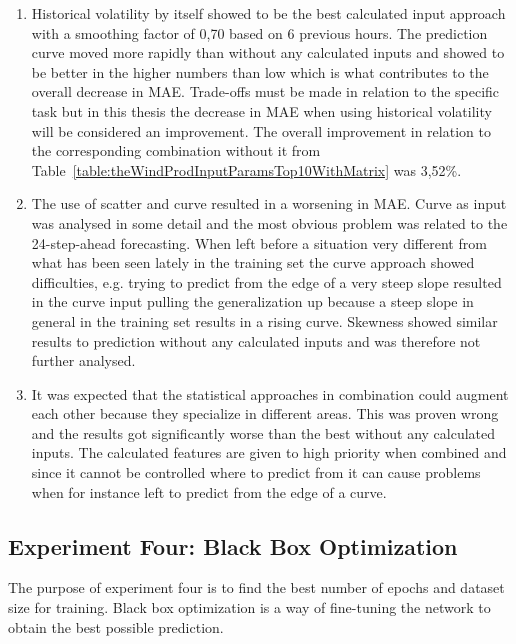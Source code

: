 \begin{enumerate}
\item Historical volatility by itself showed to be the best calculated input approach with a smoothing factor of 0,70 based on 6 previous hours. The prediction curve moved more rapidly than without any calculated inputs and showed to be better in the higher numbers than low which is what contributes to the overall decrease in MAE. Trade-offs must be made in relation to the specific task but in this thesis the decrease in MAE when using historical volatility will be considered an improvement. The overall improvement in relation to the corresponding combination without it from Table~\ref{table:theWindProdInputParamsTop10WithMatrix} was 3,52\%.
\item The use of scatter and curve resulted in a worsening in MAE. Curve as input was analysed in some detail and the most obvious problem was related to the 24-step-ahead forecasting. When left before a situation very different from what has been seen lately in the training set the curve approach showed difficulties, e.g. trying to predict from the edge of a very steep slope resulted in the curve input pulling the generalization up because a steep slope in general in the training set results in a rising curve. Skewness showed similar results to prediction without any calculated inputs and was therefore not further analysed.
\item It was expected that the statistical approaches in combination could augment each other because they specialize in different areas. This was proven wrong and the results got significantly worse than the best without any calculated inputs. The calculated features are given to high priority when combined and since it cannot be controlled where to predict from it can cause problems when for instance left to predict from the edge of a curve. 
\end{enumerate}

\newpage

\subsection{Experiment Four: Black Box Optimization}
The purpose of experiment four is to find the best number of epochs and dataset size for training. Black box optimization is a way of fine-tuning the network to obtain the best possible prediction.

